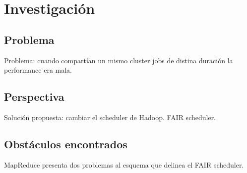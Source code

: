 \section{Investigación}

\subsection{Problema}
Problema: cuando compartían un mismo cluster jobs de distina duración la performance era mala.

\subsection{Perspectiva}
Solución propuesta: cambiar el scheduler de Hadoop. FAIR scheduler.

\subsection{Obstáculos encontrados}
MapReduce presenta dos problemas al esquema que delinea el FAIR scheduler.

